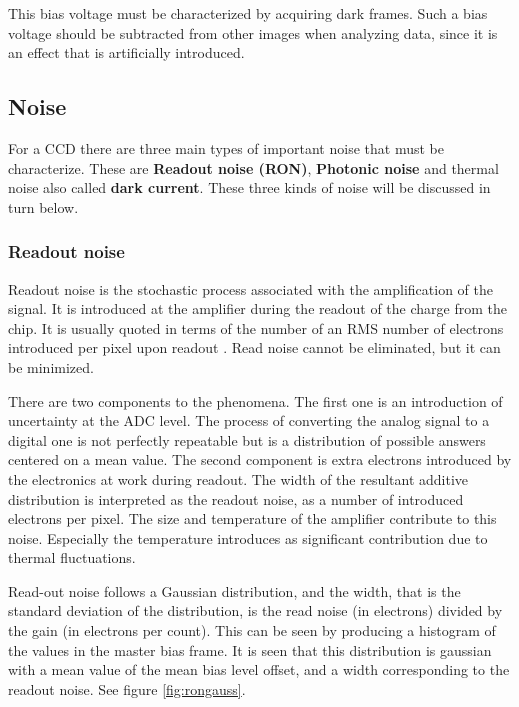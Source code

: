 \documentclass[../main.tex]{subfiles}
\begin{document}
	This bias voltage must be characterized by acquiring dark frames. Such a bias voltage should be subtracted from other images when analyzing data, since it is an effect that is artificially introduced.
	
	\subsection{Noise}
	For a CCD there are three main types of important noise that must be characterize. These are \textbf{Readout noise (RON)}, \textbf{Photonic noise} and thermal noise also called \textbf{dark current}. These three kinds of noise will be discussed in turn below. 
	
	\subsubsection{Readout noise}\label{ron}
	Readout noise is the stochastic process associated with the amplification of the signal. It is introduced at the amplifier during the readout of the charge from the chip. It is usually quoted in terms of the number of an RMS number of electrons introduced per pixel upon readout \cite{handbookofccdastronomy}. Read noise cannot be eliminated, but it can be minimized. 
	
	There are two components to the phenomena. The first one is an introduction of uncertainty at the ADC level. The process of converting the analog signal to a digital one is not perfectly repeatable but is a distribution of possible answers centered on a mean value.
	The second component is extra electrons introduced by the electronics at work during readout. The width of the resultant additive distribution is interpreted as the readout noise, as a number of introduced electrons per pixel.
	The size and temperature of the amplifier contribute to this noise. Especially the temperature introduces as significant contribution due to thermal fluctuations. 
	
	Read-out noise follows a Gaussian distribution, and the width, that is the standard deviation of the distribution, is the read noise (in electrons) divided by the gain (in electrons per count). This can be seen by producing a histogram of the values in the master bias frame. It is seen that this distribution is gaussian with a mean value of the mean bias level offset, and a width corresponding to the readout noise. See figure \ref{fig:rongauss}. 
	
\end{document}
